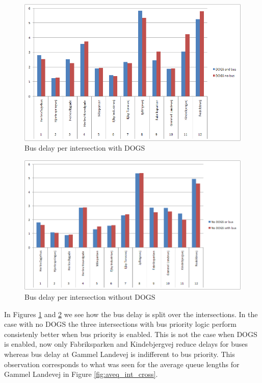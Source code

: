 \begin{figure}[ht]
\begin{center}
\includegraphics[scale=0.35]{delay_bus_intersection_dogs.PNG} 
\end{center}
\caption{Bus delay per intersection with DOGS}
\label{fig:bus_delay_int_dogs}
\end{figure}

\begin{figure}[ht]
\begin{center}
\includegraphics[scale=0.35]{delay_bus_intersection_nodogs.PNG} 
\end{center}
\caption{Bus delay per intersection without DOGS}
\label{fig:bus_delay_int_nodogs}
\end{figure}

In Figures \ref{fig:bus_delay_int_dogs} and \ref{fig:bus_delay_int_nodogs} we see how the bus delay is split over the intersections. In the case with no DOGS the three intersections with bus priority logic perform consistenly better when bus priority is enabled. This is not the case when DOGS is enabled, now only Fabriksparken and Kindebjergvej reduce delays for buses whereas bus delay at Gammel Landevej is indifferent to bus priority. This observation corresponds to what was seen for the average queue lengths for Gammel Landevej in Figure \ref{fig:aveq_int_cross}.

